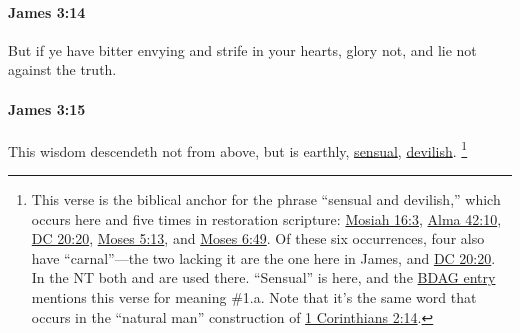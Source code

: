 		\paragraph{James 3:14} %
			\label{JAMES-3-14}

			But if ye have bitter envying and strife in your hearts, glory not, and lie not against the truth.

			\begin{framed}
			\scriptsize
				\begin{compactdesc}
					\item[SBLG] 
				\end{compactdesc}
			\end{framed}

		\paragraph{James 3:15} %
			\label{JAMES-3-15}

			This wisdom descendeth not from above, but is earthly, \hyperref[SENSUAL]{sensual}, \hyperref[DEVILISH]{devilish}.%
				\footnote{%
					This verse is the biblical anchor for the phrase ``sensual and devilish,'' which occurs here and five times in restoration scripture: \hyperref[MOSIAH-16-3]{Mosiah 16:3}, \hyperref[ALMA-42-10]{Alma 42:10}, \hyperref[DC20-20]{DC 20:20}, \hyperref[MOSES-5-13]{Moses 5:13}, and \hyperref[MOSES-6-49]{Moses 6:49}. Of these six occurrences, four also have ``carnal''---the two lacking it are the one here in James, and \hyperref[DC20-20]{DC 20:20}. In the NT both  and  are used there. ``Sensual'' is  here, and the \hyperref[PSUCHIKOS]{BDAG entry} mentions this verse for meaning \#1.a. Note that it's the same word that occurs in the ``natural man'' construction of \hyperref[1CORINTHIANS-2-14]{1 Corinthians 2:14}.
					}

